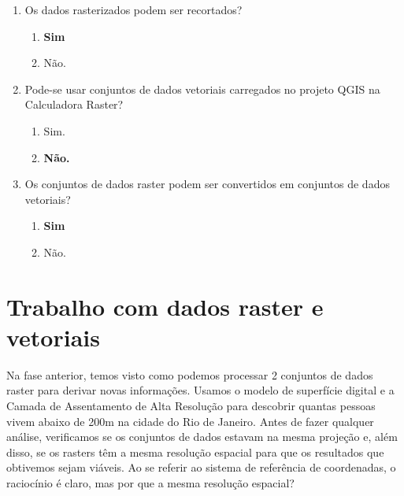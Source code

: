 \documentclass[
]{krantz}
\providecommand{\tightlist}{%
  \setlength{\itemsep}{0pt}\setlength{\parskip}{0pt}}
\begin{document}
\begin{enumerate}
\def\labelenumi{\arabic{enumi}.}
\tightlist
\item
  Os dados rasterizados podem ser recortados?

  \begin{enumerate}
  \def\labelenumii{\alph{enumii}.}
  \tightlist
  \item
    \textbf{Sim}
  \item
    Não.
  \end{enumerate}
\item
  Pode-se usar conjuntos de dados vetoriais carregados no projeto QGIS na Calculadora Raster?

  \begin{enumerate}
  \def\labelenumii{\alph{enumii}.}
  \tightlist
  \item
    Sim.
  \item
    \textbf{Não.}
  \end{enumerate}
\item
  Os conjuntos de dados raster podem ser convertidos em conjuntos de dados vetoriais?

  \begin{enumerate}
  \def\labelenumii{\alph{enumii}.}
  \tightlist
  \item
    \textbf{Sim}
  \item
    Não.
  \end{enumerate}
\end{enumerate}

\hypertarget{trabalho-com-dados-raster-e-vetoriais}{%
\section{Trabalho com dados raster e vetoriais}\label{trabalho-com-dados-raster-e-vetoriais}}

Na fase anterior, temos visto como podemos processar 2 conjuntos de dados raster para derivar novas informações. Usamos o modelo de superfície digital e a Camada de Assentamento de Alta Resolução para descobrir quantas pessoas vivem abaixo de 200m na \hspace{0pt}\hspace{0pt}cidade do Rio de Janeiro. Antes de fazer qualquer análise, verificamos se os conjuntos de dados estavam na mesma projeção e, além disso, se os rasters têm a mesma resolução espacial para que os resultados que obtivemos sejam viáveis. Ao se referir ao sistema de referência de coordenadas, o raciocínio é claro, mas por que a mesma resolução espacial?
\end{document}
